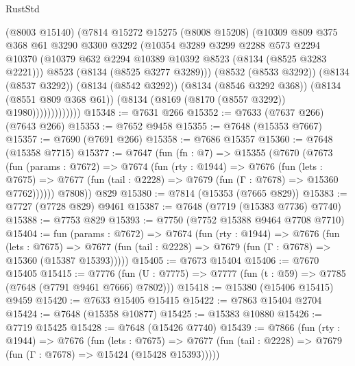 \begin{lexlean}{RustStd}
\begin{coremodule}
                      (@8003 @15140)
                      (@7814
                        @15272
                        @15275
                        (@8008 @15208)
                        (@10309
                          @809
                          @375
                          @368
                          @61
                          @3290
                          @3300
                          @3292
                          (@10354
                            @3289
                            @3299
                            @2288
                            @573
                            @2294
                            @10370
                            (@10379 @632 @2294 @10389 @10392 @8523 (@8134 (@8525 @3283 @2221)))
                            @8523
                            (@8134 (@8525 @3277 @3289)))
                          (@8532 (@8533 @3292))
                          (@8134 (@8537 @3292))
                          (@8134 (@8542 @3292))
                          (@8134 (@8546 @3292 @368))
                          (@8134 (@8551 @809 @368 @61))
                          (@8134 (@8169 (@8170 (@8557 @3292)) @1980)))))))))))))
@15348 := @7631 @266
@15352 := @7633 (@7637 @266) (@7643 @266)
@15353 := @7652 @9458
@15355 := @7648 (@15353 @7667)
@15357 := @7690 (@7691 @266)
@15358 := @7686 @15357
@15360 := @7648 (@15358 @7715)
@15377 := @7647
    (fun (fn : @7) =>
    @15355
      (@7670
        (@7673
          (fun (params : @7672) =>
          @7674
            (fun (rty : @1944) =>
            @7676
              (fun (lets : @7675) =>
              @7677 (fun (tail : @2228) => @7679 (fun (Γ : @7678) => @15360 @7762))))))
        @7808))
    @829
@15380 := @7814 (@15353 (@7665 @829))
@15383 := @7727 (@7728 @829) @9461
@15387 := @7648 (@7719 (@15383 @7736) @7740)
@15388 := @7753 @829
@15393 := @7750 (@7752 @15388 @9464 @7708 @7710)
@15404 := fun (params : @7672) =>
  @7674
    (fun (rty : @1944) =>
    @7676
      (fun (lets : @7675) =>
      @7677 (fun (tail : @2228) => @7679 (fun (Γ : @7678) => @15360 (@15387 @15393)))))
@15405 := @7673 @15404
@15406 := @7670 @15405
@15415 := @7776
    (fun (U : @7775) => @7777 (fun (t : @59) => @7785 (@7648 (@7791 @9461 @7666) @7802)))
@15418 := @15380 (@15406 @15415) @9459
@15420 := @7633 @15405 @15415
@15422 := @7863 @15404 @2704
@15424 := @7648 (@15358 @10877)
@15425 := @15383 @10880
@15426 := @7719 @15425
@15428 := @7648 (@15426 @7740)
@15439 := @7866
    (fun (rty : @1944) =>
    @7676
      (fun (lets : @7675) =>
      @7677 (fun (tail : @2228) => @7679 (fun (Γ : @7678) => @15424 (@15428 @15393)))))

\end{coremodule}
\end{lexlean}

